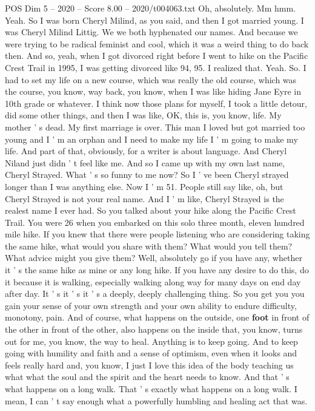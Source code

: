 \begin{textsample}{POS Dim 5 – 2020 – Score 8.00 – 2020/t004063.txt}
Oh, absolutely.
Mm hmm.
Yeah.
So I was born Cheryl Milind, as you said, and then I got married young.
I was Cheryl Milind Littig.
We we both hyphenated our names.
And because we were trying to be radical feminist and cool, which it was a weird thing to do back then.
And so, yeah, when I got divorced right before I went to hike on the Pacific Crest Trail in 1995, I was getting divorced like 94, 95.
I realized that.
Yeah.
So.
I had to set my life on a new course, which was really the old course, which was the course, you know, way back, you know, when I was like hiding Jane Eyre in 10th grade or whatever.
I think now those plans for myself, I took a little detour, did some other things, and then I was like, OK, this is, you know, life.
My mother ' s dead.
My first marriage is over.
This man I loved but got married too young and I ' m an orphan and I need to make my life I ' m going to make my life.
And part of that, obviously, for a writer is about language.
And Cheryl Niland just didn ' t feel like me.
And so I came up with my own last name, Cheryl Strayed.
What ' s so funny to me now?
So I ' ve been Cheryl strayed longer than I was anything else.
Now I ' m 51.
People still say like, oh, but Cheryl Strayed is not your real name.
And I ' m like, Cheryl Strayed is the realest name I ever had.
So you talked about your hike along the Pacific Crest Trail.
You were 26 when you embarked on this solo three month, eleven hundred mile hike.
If you knew that there were people listening who are considering taking the same hike, what would you share with them?
What would you tell them?
What advice might you give them?
Well, absolutely go if you have any, whether it ' s the same hike as mine or any long hike.
If you have any desire to do this, do it because it is walking, especially walking along way for many days on end day after day.
It ' s it ' s it ' s a deeply, deeply challenging thing.
So you get you you gain your sense of your own strength and your own ability to endure difficulty, monotony, pain.
And of course, what happens on the outside, one \textbf{foot} in front of the other in front of the other, also happens on the inside that, you know, turns out for me, you know, the way to heal.
Anything is to keep going.
And to keep going with humility and faith and a sense of optimism, even when it looks and feels really hard and, you know, I just I love this idea of the body teaching us what what the soul and the spirit and the heart needs to know.
And that ' s what happens on a long walk.
That ' s exactly what happens on a long walk.
I mean, I can ' t say enough what a powerfully humbling and healing act that was.

\end{textsample}
